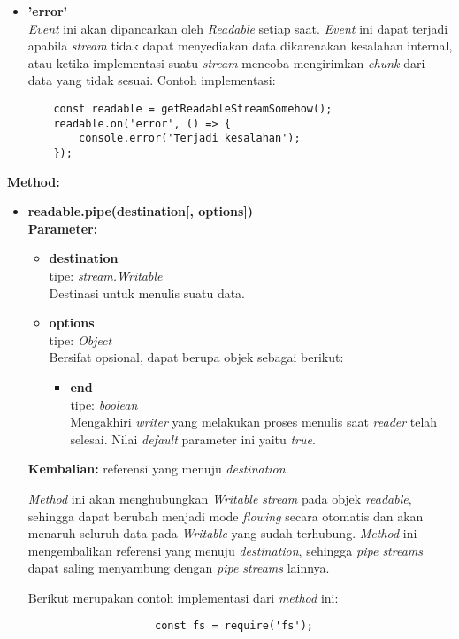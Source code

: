 \begin{enumerate}
\begin{itemize}
\begin{itemize}
				\item \textbf{'error'} \\ \textit{Event} ini akan dipancarkan oleh \textit{Readable} setiap saat. \textit{Event} ini dapat terjadi apabila \textit{stream} tidak dapat menyediakan data dikarenakan kesalahan internal, atau ketika implementasi suatu \textit{stream} mencoba mengirimkan \textit{chunk} dari data yang tidak sesuai. Contoh implementasi:
	\begin{lstlisting}
	const readable = getReadableStreamSomehow();
	readable.on('error', () => {
		console.error('Terjadi kesalahan');
	});
	\end{lstlisting}
			\end{itemize}
		
		\textbf{Method:}
			\begin{itemize}
				\item \textbf{readable.pipe(destination[, options])} \\ \textbf{Parameter:}
				\begin{itemize}
					\item \textbf{destination} \\tipe: \textit{stream.Writable} \\ Destinasi untuk menulis suatu data.
					\item \textbf{options} \\tipe: \textit{Object} \\ Bersifat opsional, dapat berupa objek sebagai berikut:
					\begin{itemize}
						\item \textbf{end} \\tipe: \textit{boolean} \\ Mengakhiri \textit{writer} yang melakukan proses menulis saat \textit{reader} telah selesai. Nilai \textit{default} parameter ini yaitu \textit{true}.
					\end{itemize}
				\end{itemize}
				\textbf{Kembalian:} referensi yang menuju \textit{destination}.
				
				\textit{Method} ini akan menghubungkan \textit{Writable stream} pada objek \textit{readable}, sehingga dapat berubah menjadi mode \textit{flowing} secara otomatis dan akan menaruh seluruh data pada \textit{Writable} yang sudah terhubung. \textit{Method} ini mengembalikan referensi yang menuju \textit{destination}, sehingga \textit{pipe streams} dapat saling menyambung dengan \textit{pipe streams} lainnya.
				
				Berikut merupakan contoh implementasi dari \textit{method} ini:
				\begin{lstlisting}
					const fs = require('fs');
					

\end{lstlisting}
\end{itemize}
\end{itemize}
\end{enumerate}
